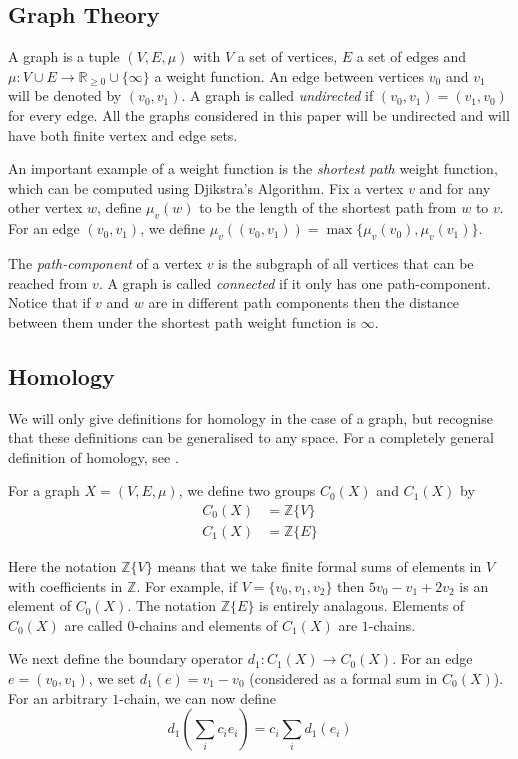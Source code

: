 \documentclass[12pt,a4paper]{amsart}
\numberwithin{equation}{section}
\def\Z{{\mathbb Z}}
\theoremstyle{plain}
\theoremstyle{definition}
\begin{document}
\subsection{Graph Theory}

A graph is a tuple $(V, E, \mu)$ with $V$ a set of vertices, $E$ a set of edges and $\mu : V \cup E \to \mathbb{R}_{\geq 0} \cup \{\infty\}$ a weight function. An edge between vertices $v_0$ and $v_1$ will be denoted by $(v_0, v_1)$. A graph is called \textit{undirected} if $(v_0, v_1) = (v_1, v_0)$ for every edge. All the graphs considered in this paper will be undirected and will have both finite vertex and edge sets.

An important example of a weight function is the \textit{shortest path} weight function, which can be computed using Djikstra's Algorithm. Fix a vertex $v$ and for any other vertex $w$, define $\mu_v(w)$ to be the length of the shortest path from $w$ to $v$. For an edge $(v_0, v_1)$, we define $\mu_v((v_0, v_1)) = \max\{\mu_v(v_0), \mu_v(v_1)\}$.

The \textit{path-component} of a vertex $v$ is the subgraph of all vertices that can be reached from $v$. A graph is called \textit{connected} if it only has one path-component. Notice that if $v$ and $w$ are in different path components then the distance between them under the shortest path weight function is $\infty$.

\subsection{Homology}

We will only give definitions for homology in the case of a graph, but recognise that these definitions can be generalised to any space. For a completely general definition of homology, see \cite{hatcher}.

For a graph $X = (V, E, \mu)$, we define two groups $C_0(X)$ and $C_1(X)$ by
\begin{align*}
C_0(X) &= \Z\{V\}  \\
C_1(X) &= \Z\{E\}
\end{align*}

Here the notation $\Z\{V\}$ means that we take finite formal sums of elements in $V$ with coefficients in $\Z$. For example, if $V=\{v_0, v_1, v_2\}$ then $5v_0 - v_1 + 2v_2$ is an element of $C_0(X)$. The notation $\Z\{E\}$ is entirely analagous. Elements of $C_0(X)$ are called $0$-chains and elements of $C_1(X)$ are $1$-chains.

We next define the boundary operator $d_1 : C_1(X) \to C_0(X)$. For an edge $e=(v_0,v_1)$, we set $d_1(e) = v_1-v_0$ (considered as a formal sum in $C_0(X)$). For an arbitrary $1$-chain, we can now define
\[ d_1\left( \sum_i c_i e_i \right) = c_i \sum_i d_1(e_i) \]
\end{document}
